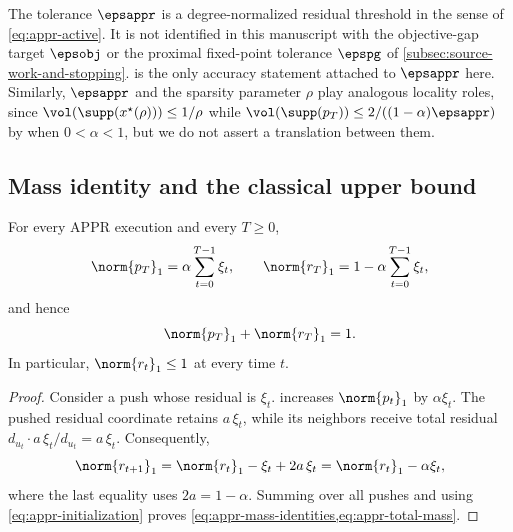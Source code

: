 \begin{remark}
\label{rem:appr-epsilon-scope}
The tolerance \(\epsappr\) is a degree-normalized residual threshold in the
sense of \cref{eq:appr-active}. It is not identified in this manuscript with
the objective-gap target \(\epsobj\) or the proximal fixed-point tolerance
\(\epspg\) of
\cref{subsec:source-work-and-stopping}.  is the only
accuracy statement attached to \(\epsappr\) here. Similarly, \(\epsappr\) and
the sparsity parameter \(\rho\) play analogous locality roles, since
\(\vol(\supp(x^\star(\rho)))\leq1/\rho\) while
\(\vol(\supp(p_T))\leq2/((1-\alpha)\epsappr)\) by
\citet[Theorem~3.2]{andersen2007using} when \(0<\alpha<1\), but we do not
assert a translation between them.
\end{remark}

\subsection{Mass identity and the classical upper bound}
\label{subsec:appr-upper-bound}

\begin{lemma}
\label{lem:appr-mass-identity}
For every APPR execution and every \(T\geq0\),
\begin{equation}
    \norm{p_T}_1
    =\alpha\sum_{t=0}^{T-1}\xi_t,
    \qquad
    \norm{r_T}_1
    =1-\alpha\sum_{t=0}^{T-1}\xi_t,
    \label{eq:appr-mass-identities}
\end{equation}
and hence
\begin{equation}
    \norm{p_T}_1+\norm{r_T}_1=1.
    \label{eq:appr-total-mass}
\end{equation}
In particular, \(\norm{r_t}_1\leq1\) at every time \(t\).
\end{lemma}

\begin{proof}
Consider a push whose residual is \(\xi_t\). 
increases \(\norm{p_t}_1\) by \(\alpha \xi_t\). The pushed residual coordinate
retains \(a\,\xi_t\), while its neighbors receive total residual
\(d_{u_t}\cdot a\,\xi_t/d_{u_t}=a\,\xi_t\). Consequently,
\begin{equation}
    \norm{r_{t+1}}_1
    =\norm{r_t}_1-\xi_t+2a\,\xi_t
    =\norm{r_t}_1-\alpha \xi_t,
    \label{eq:appr-one-step-mass}
\end{equation}
where the last equality uses \(2a=1-\alpha\). Summing over all pushes and
using \cref{eq:appr-initialization} proves
\cref{eq:appr-mass-identities,eq:appr-total-mass}.
\end{proof}

